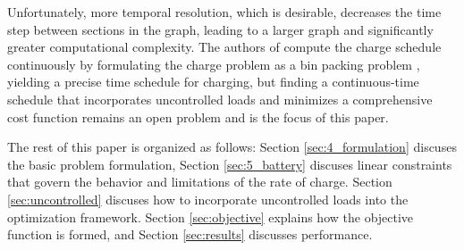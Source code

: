 \par Unfortunately, more temporal resolution, which is desirable, decreases the time step between sections in the graph, leading to a larger graph and significantly greater computational complexity. The authors of \cite{brown_position_nodate} compute the charge schedule continuously by formulating the charge problem as a bin packing problem \cite{Ma_Mixed-integer_2017}, yielding a precise time schedule for charging, but finding a continuous-time schedule that incorporates uncontrolled loads and minimizes a comprehensive cost function remains an open problem and is the focus of this paper. 
\par The rest of this paper is organized as follows: Section \ref{sec:4_formulation} discuses the basic problem formulation, Section \ref{sec:5_battery} discuses linear constraints that govern the behavior and limitations of the rate of charge. Section \ref{sec:uncontrolled} discuses how to incorporate uncontrolled loads into the optimization framework. Section \ref{sec:objective} explains how the objective function is formed, and Section \ref{sec:results} discusses performance.
